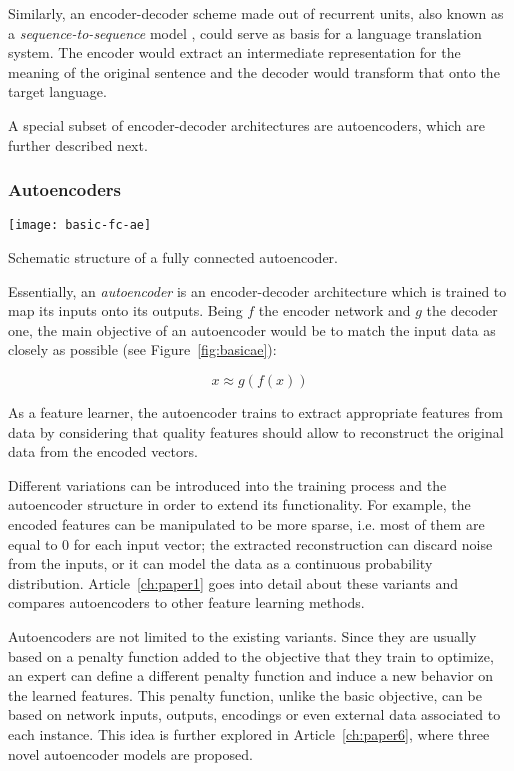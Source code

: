Similarly, an encoder-decoder scheme made out of recurrent units, also known as a \textit{sequence-to-sequence} model , could serve as basis for a language translation system. The encoder would extract an intermediate representation for the meaning of the original sentence and the decoder would transform that onto the target language.

A special subset of encoder-decoder architectures are autoencoders, which are further described next.

\subsubsection{Autoencoders}

\begin{marginfigure}
    \texttt{[image: basic-fc-ae]}
    \caption{\label{fig:basicae}Schematic structure of a fully connected autoencoder.}
\end{marginfigure}

Essentially, an \textit{autoencoder} is an encoder-decoder architecture which is trained to map its inputs onto its outputs. Being $f$ the encoder network and $g$ the decoder one, the main objective of an autoencoder would be to match the input data as closely as possible (see Figure~\ref{fig:basicae}):

\begin{equation}
    x\approx g(f(x))
\end{equation}

As a feature learner, the autoencoder trains to extract appropriate features from data by considering that quality features should allow to reconstruct the original data from the encoded vectors.

Different variations can be introduced into the training process and the autoencoder structure in order to extend its functionality. For example, the encoded features can be manipulated to be more sparse, i.e. most of them are equal to 0 for each input vector; the extracted reconstruction can discard noise from the inputs, or it  can model the data as a continuous probability distribution. Article~\ref{ch:paper1} goes into detail about these variants and compares autoencoders to other feature learning methods.

Autoencoders are not limited to the existing variants. Since they are usually based on a penalty function added to the objective that they train to optimize, an expert can define a different penalty function and induce a new behavior on the learned features. This penalty function, unlike the basic objective, can be based on network inputs, outputs, encodings or even external data associated to each instance. This idea is further explored in Article~\ref{ch:paper6}, where three novel autoencoder models are proposed.

